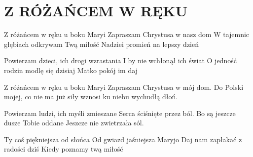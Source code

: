 \documentclass[../../../songbook.tex]{subfiles}
\begin{document}
\TabPositions{8cm} %
\section*{Z RÓŻAŃCEM W RĘKU}
{}
\vspace{0.5cm}
Z różańcem w ręku u boku Maryi				 \newline
Zapraszam Chrystusa w nasz dom				 \newline
W tajemnic głębiach odkrywam Twą miłość		 \newline
Nadziei promień na lepszy dzień				 \newline

\-\hspace{1cm} Powierzam dzieci, ich drogi wzrastania		 \newline
\-\hspace{1cm} I by nie wchłonął ich świat					 \newline
\-\hspace{1cm} O jedność rodzin modlę się dzisiaj			 \newline
\-\hspace{1cm} Matko pokój im daj							 \newline

Z różańcem w ręku u boku Maryi  \newline
Zapraszam Chrystusa w mój dom.  \newline
Do Polski mojej, co nie ma już siły  \newline
wznosi ku niebu wychudłą dłoń.  \newline

\-\hspace{1cm} Powierzam ludzi, ich myśli zmieszane  \newline
\-\hspace{1cm} Serca ściśnięte przez ból.  \newline
\-\hspace{1cm} Bo są jeszcze dusze Tobie oddane  \newline
\-\hspace{1cm} Jeszcze nie zwietrzała sól.  \newline

Ty coś piękniejsza od słońca		 \newline
Od gwiazd jaśniejsza Maryjo			 \newline
Daj nam zapłakać z radości dziś		 \newline
Kiedy poznamy twą miłość			 \newline
\end{document}
